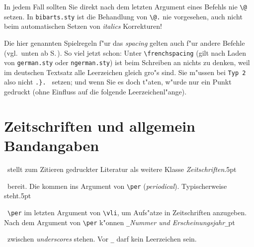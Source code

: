 \documentclass[12pt,a4paper]{article}
\newcommand{\pdfko}[1]{\kern #1pt
                          \strut\ignorespaces}%
\begin{document}
In jedem Fall sollten Sie direkt nach dem letzten Argument eines \BibArts\hy Befehls
nie \verb|\@| setzen. In \texttt{bibarts.sty} ist die Behandlung von \verb|\@.| 
nie vorgesehen, auch nicht beim automatischen Setzen von \textit{italics}\hy 
Korrekturen!

\vspace{2ex}\noindent
Die hier genannten Spielregeln f"ur das \textit{spacing} gelten
auch f"ur andere \BibArts\hy Befehle (vgl.\ unten ab S.\,\pageref{Punkte}). 
So viel jetzt schon: Unter \verb|\frenchspacing| (gilt 
nach Laden von \verb|german.sty| oder \verb|ngerman.sty|) ist 
beim Schreiben an nichts zu denken, weil im deutschen
Textsatz alle Leerzeichen gleich gro"s sind. Sie m"ussen bei 
\verb|Typ 2| also nicht \verb*|.}. | setzen; und wenn Sie es doch 
t"aten, w"urde nur ein Punkt gedruckt (ohne Einfluss auf die 
folgende Leerzeichenl"ange).


\section{Zeitschriften und allgemein Bandangaben}\label{Sect6}\label{per}

\BibArts\ stellt zum Zitieren gedruckter Literatur als weitere Klasse
\textit{Zeitschriften}\pdfko{.5}\ bereit. Die kommen ins Argument von \verb|\per| 
(\textit{periodical}). Typischerweise steht\pdfko{.5}\ \verb|\per| im letzten 
Argument von \verb|\vli|, um Aufs"atze in Zeitschriften anzugeben. 
Nach dem Argument von \verb|\per| k"onnen \verb|_|\textit{Nummer und 
Erscheinungsjahr}\ko\verb|_|\pdfko{1}\ zwischen \textit{underscores} stehen. 
Vor \verb|_| darf kein Leerzeichen sein.
\end{document}
